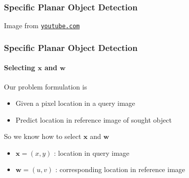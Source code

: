 \documentclass[xetex,professionalfont]{beamer}
\renewcommand{\vec}[1]{\ensuremath{\mathbf{#1}}}
\newcommand{\vw}{\vec{w}}
\newcommand{\vx}{\vec{x}}
\begin{document}

\begin{frame}
\frametitle{Specific Planar Object Detection}

\begin{center}
    {\centering Image from \href{https://www.youtube.com/watch?v=ChGW2Jogdjs}{\texttt{youtube.com}}}
\end{center}

\end{frame}


\begin{frame}
\frametitle{Specific Planar Object Detection}
\framesubtitle{Selecting $\vx$ and $\vw$}

Our problem formulation is  %
\begin{itemize}
	\item Given a pixel location in a query image
	\item Predict location in reference image of sought object  %
\end{itemize}

\bigskip
So we know how to select $\vx$ and $\vw$
\begin{itemize}
	\item $\vx=(x,y)$ : location in query image
	\item $\vw=(u,v)$ : corresponding location in reference image
\end{itemize}

\end{frame}

\end{document}
